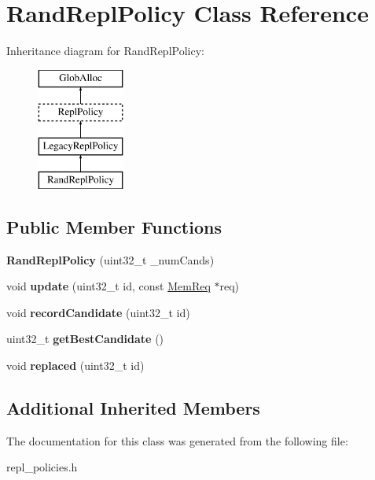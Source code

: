 \hypertarget{classRandReplPolicy}{\section{Rand\-Repl\-Policy Class Reference}
\label{classRandReplPolicy}
}
Inheritance diagram for Rand\-Repl\-Policy\-:\begin{figure}[H]
\begin{center}
\leavevmode
\includegraphics[height=4.000000cm]{classRandReplPolicy}
\end{center}
\end{figure}
\subsection*{Public Member Functions}
\begin{DoxyCompactItemize}
\item 
\hypertarget{classRandReplPolicy_a1e08886e13510e155af165e8c3ac0120}{{\bfseries Rand\-Repl\-Policy} (uint32\-\_\-t \-\_\-num\-Cands)}\label{classRandReplPolicy_a1e08886e13510e155af165e8c3ac0120}

\item 
\hypertarget{classRandReplPolicy_a80a6976f9f7c25dad50db398462876a3}{void {\bfseries update} (uint32\-\_\-t id, const \hyperlink{structMemReq}{Mem\-Req} $\ast$req)}\label{classRandReplPolicy_a80a6976f9f7c25dad50db398462876a3}

\item 
\hypertarget{classRandReplPolicy_a92bed65d2acc964c2c5f4d5cc8e369b9}{void {\bfseries record\-Candidate} (uint32\-\_\-t id)}\label{classRandReplPolicy_a92bed65d2acc964c2c5f4d5cc8e369b9}

\item 
\hypertarget{classRandReplPolicy_ab8459c0adc8ed9caf7492313b862e113}{uint32\-\_\-t {\bfseries get\-Best\-Candidate} ()}\label{classRandReplPolicy_ab8459c0adc8ed9caf7492313b862e113}

\item 
\hypertarget{classRandReplPolicy_a75fd48bd27a192896560608890360556}{void {\bfseries replaced} (uint32\-\_\-t id)}\label{classRandReplPolicy_a75fd48bd27a192896560608890360556}

\end{DoxyCompactItemize}
\subsection*{Additional Inherited Members}


The documentation for this class was generated from the following file\-:\begin{DoxyCompactItemize}
\item 
repl\-\_\-policies.\-h\end{DoxyCompactItemize}
